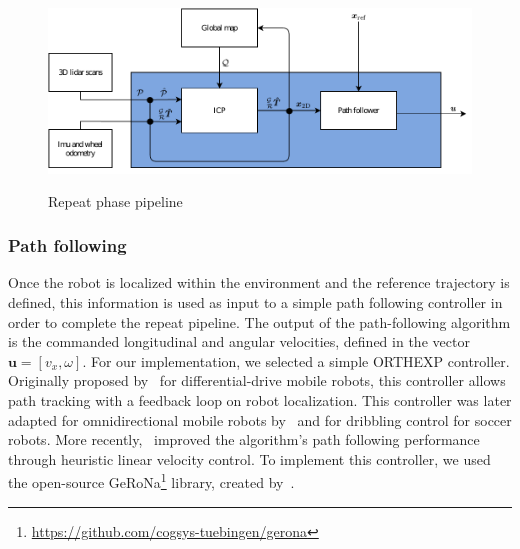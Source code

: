 \begin{figure} [htpb]
	\centering
	\includegraphics[height=2.0in]{figs/repeat_pipeline/repeat_pipeline.pdf}
	\caption{Repeat phase pipeline}
	\label{fig:repeat_pipeline}
\end{figure}

\subsubsection{Path following}
\label{sec:orthexp}


Once the robot is localized within the environment and the reference trajectory is defined, this information is used as input to a simple path following controller in order to complete the repeat pipeline.
The output of the path-following algorithm is the commanded longitudinal and angular velocities, defined in the vector $\bm u = [v_x, \omega]$.
For our implementation, we selected a simple \ac{ORTHEXP} controller. 
Originally proposed by~\citet{Mojaev2004} for differential-drive mobile robots, this controller allows path tracking with a feedback loop on robot localization.
This controller was later adapted for omnidirectional mobile robots by~\citet{Li2007} and for dribbling control for soccer robots.
More recently,~\citet{Huskic2017} improved the algorithm's path following performance through heuristic linear velocity control.
To implement this controller, we used the open-source \ac{GeRoNa}\footnote{\url{https://github.com/cogsys-tuebingen/gerona}} library, created by~\citet{Huskic2019}.


